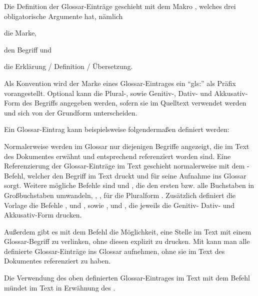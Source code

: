 Die Definition der Glossar-Einträge geschieht mit dem Makro ,
welches drei obligatorische Argumente hat, nämlich
\begin{itemize*}
\item die Marke,
\item den Begriff und
\item die Erklärung / Definition / Übersetzung.
\end{itemize*}
Als Konvention wird der Marke eines Glossar-Eintrages ein \enquote{gls:} als Präfix vorangestellt.
Optional kann die Plural-, sowie Genitiv-, Dativ- und Akkusativ-Form des Begriffs angegeben werden,
sofern sie im Quelltext verwendet werden und sich von der Grundform unterscheiden.

Ein Glossar-Eintrag kann beispielsweise folgendermaßen definiert werden:
\begin{latex}[caption={Definition eines Glossar-Eintrages},label={lst:GlossEntry}]
\end{latex}

Normalerweise werden im Glossar nur diejenigen Begriffe angezeigt,
die im Text des Dokumentes erwähnt und entsprechend referenziert worden sind.
Eine Referenzierung der Glossar-Einträge im Text geschieht normalerweise mit dem
-Befehl,
welcher den Begriff im Text druckt und für seine Aufnahme ins Glossar sorgt.
Weitere mögliche Befehle sind  und ,
die den ersten bzw. alle Buchstaben in Großbuchstaben umwandeln,
, ,  für die Pluralform \usw.
Zusätzlich definiert die Vorlage die Befehle
,  und , sowie
,  und ,
die jeweils die Genitiv- Dativ- und Akkusativ-Form drucken.

Außerdem gibt es mit dem Befehl  die Möglichkeit,
eine Stelle im Text mit einem Glossar-Begriff zu verlinken, ohne diesen explizit zu drucken.
Mit  kann man alle definierte Glossar-Einträge ins Glossar aufnehmen,
ohne sie im Text des Dokumentes referenziert zu haben.

Die Verwendung des oben definierten Glossar-Eintrages im Text mit dem Befehl
 mündet im Text in Erwähnung des .


